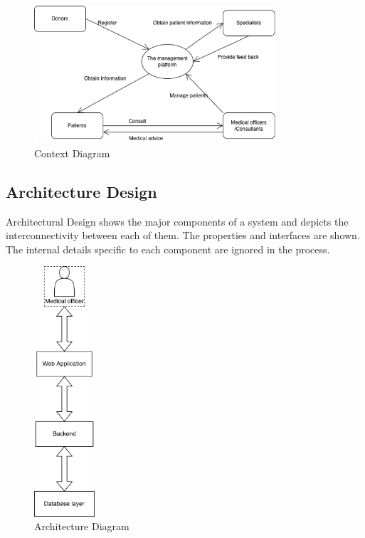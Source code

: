 \documentclass[12pt,a4paper]{report}
\begin{document}
\begin{figure}[h]
\begin{center}
\includegraphics[width=0.8\textwidth]{images/context.png}	
\end{center}
\caption{Context Diagram}
\label{fig:context}
\end{figure}

\newpage

\subsection{Architecture Design}
Architectural Design shows the major components of a system and depicts the interconnectivity between each of them. The properties and interfaces are shown. The internal details specific to each component are ignored in the process.  

\begin{figure}[h]
\begin{center}
\includegraphics[width=0.2\textwidth]{images/arch.png}	
\end{center}
\caption{Architecture Diagram}
\label{fig:arch}
\end{figure}
\end{document}
